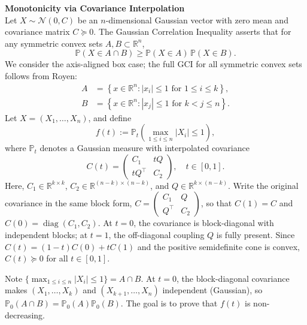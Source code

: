\begin{technical}
{\Large\textbf{Monotonicity via Covariance Interpolation}}\\
Let \( X \sim \mathcal{N}(0, C) \) be an \( n \)-dimensional Gaussian vector with zero mean and covariance matrix \( C \succcurlyeq 0 \). The Gaussian Correlation Inequality asserts that for any symmetric convex sets \( A, B \subset \mathbb{R}^n \),
\[
\mathbb{P}(X \in A \cap B) \ge \mathbb{P}(X \in A)\,\mathbb{P}(X \in B).
\]
We consider the axis-aligned box case; the full GCI for all symmetric convex sets follows from Royen:
\begin{align*}
A &= \left\{ x \in \mathbb{R}^n : |x_i| \le 1 \text{ for } 1 \le i \le k \right\}, \\
B &= \left\{ x \in \mathbb{R}^n : |x_j| \le 1 \text{ for } k < j \le n \right\}.
\end{align*}
Let \( X = (X_1, \dots, X_n) \), and define
\[
f(t) := \mathbb{P}_t\left( \max_{1 \le i \le n} |X_i| \le 1 \right),
\]
where \( \mathbb{P}_t \) denotes a Gaussian measure with interpolated covariance
\[
C(t) = 
\begin{pmatrix}
C_1 & tQ \\
tQ^\top & C_2
\end{pmatrix}, \quad t \in [0,1].
\]
Here, \( C_1 \in \mathbb{R}^{k \times k} \), \( C_2 \in \mathbb{R}^{(n-k) \times (n-k)} \), and \( Q \in \mathbb{R}^{k \times (n-k)} \). Write the original covariance in the same block form, \( C = \begin{pmatrix} C_1 & Q \\ Q^\top & C_2 \end{pmatrix} \), so that \( C(1) = C \) and \( C(0) = \operatorname{diag}(C_1, C_2) \). At \( t = 0 \), the covariance is block-diagonal with independent blocks; at \( t = 1 \), the off-diagonal coupling \( Q \) is fully present. Since \( C(t) = (1-t)C(0) + tC(1) \) and the positive semidefinite cone is convex, \( C(t) \succeq 0 \) for all \( t \in [0,1] \).

Note \( \{\max_{1 \le i \le n} |X_i| \le 1\} = A \cap B \). At \( t = 0 \), the block-diagonal covariance makes \( (X_1, \dots, X_k) \) and \( (X_{k+1}, \dots, X_n) \) independent (Gaussian), so \( \mathbb{P}_0(A \cap B) = \mathbb{P}_0(A)\mathbb{P}_0(B) \). The goal is to prove that \( f(t) \) is non-decreasing.


\end{technical}
